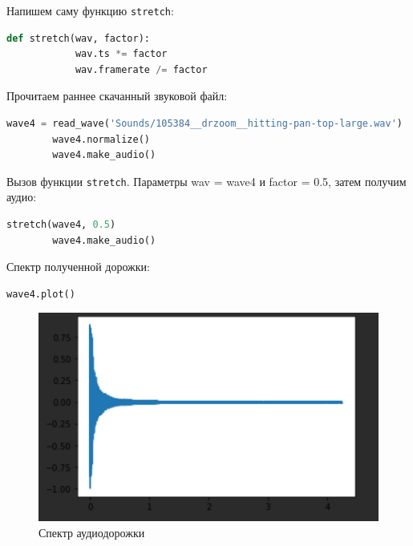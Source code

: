 \documentclass[a4]{article}
\begin{document}
    Напишем саму функцию \texttt{stretch}:

    \begin{lstlisting}[language=Python, caption= Функция \texttt{stretch}, label={lst:stretch}]
        def stretch(wav, factor):
            wav.ts *= factor
            wav.framerate /= factor
    \end{lstlisting}

    Прочитаем раннее скачанный звуковой файл:

    \begin{lstlisting}[language=Python, caption= Чтение файла, label={lst:load_wave4}]
        wave4 = read_wave('Sounds/105384__drzoom__hitting-pan-top-large.wav')
        wave4.normalize()
        wave4.make_audio()
    \end{lstlisting}

    Вызов функции \texttt{stretch}.
    Параметры wav = wave4 и factor = 0.5, затем получим аудио:

    \begin{lstlisting}[language=Python, caption= Вызов функции \texttt{stretch},label={lst:stretch_call}]
        stretch(wave4, 0.5)
        wave4.make_audio()
    \end{lstlisting}

    Спектр полученной дорожки:

    \begin{lstlisting}[language=Python, caption= Спектр после вызова функции \texttt{stretch}, label={lst:get_spectr}]
        wave4.plot()
    \end{lstlisting}

    \begin{figure}[H]
        \centering
        \includegraphics[width=\textwidth]{stretch_audio_result}
        \caption{Спектр аудиодорожки}
        \label{fig:stretch_audio_result}
    \end{figure}
\end{document}
